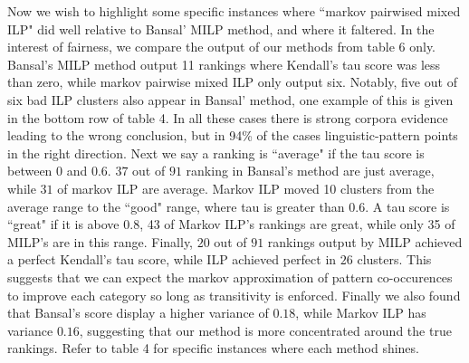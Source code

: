Now we wish to highlight some specific instances where ``markov pairwised mixed ILP" did well relative to Bansal' MILP method, and where it faltered. In the interest of fairness, we compare the output of our methods from table 6 only. Bansal's MILP method output 11 rankings where Kendall's tau score was less than zero, while  markov pairwise mixed ILP only output six. Notably, five out of six bad ILP clusters also appear in Bansal' method, one example of this is given in the bottom row of table 4. In all these cases there is strong corpora evidence leading to the wrong conclusion, but in 94\% of the cases linguistic-pattern points in the right direction. Next we say a ranking is ``average" if the tau score is between $0$ and $0.6$. $37$ out of $91$ ranking in Bansal's method are just average, while $31$ of markov ILP are average. Markov ILP moved 10 clusters from the average range to the ``good" range, where tau is greater than $0.6$. A tau score is ``great" if it is above $0.8$, 43 of Markov ILP's rankings are great, while only 35 of MILP's are in this range. Finally, $20$ out of $91$ rankings output by MILP achieved a perfect Kendall's tau score, while ILP achieved perfect in $26$ clusters. This suggests that we can expect the markov approximation of pattern co-occurences to improve each category so long as transitivity is enforced. Finally we also found that Bansal's score display a higher variance of $0.18$, while Markov ILP has variance $0.16$, suggesting that our method is more concentrated around the true rankings. Refer to table 4 for specific instances where each method shines. 





